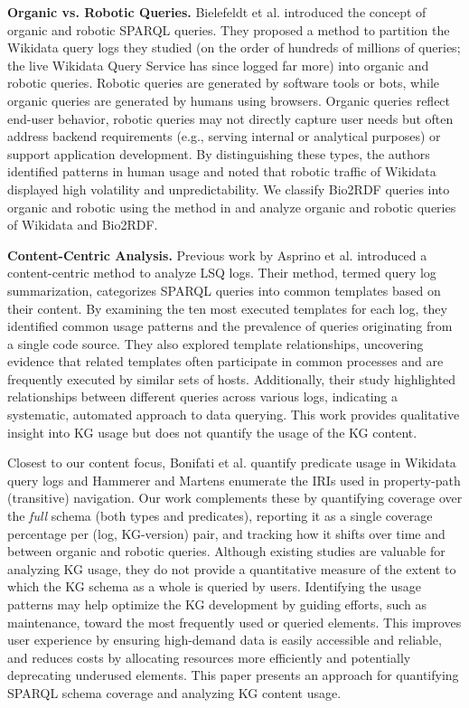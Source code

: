 \documentclass[sw]{iosart2x}
\begin{document}
\textbf{Organic vs. Robotic Queries.} Bielefeldt et al. \cite{bielefeldt2018practical,malyshev2018getting} introduced the concept of organic and robotic SPARQL queries. They proposed a method to partition the Wikidata query logs they studied (on the order of hundreds of millions of queries; the live Wikidata Query Service has since logged far more) into organic and robotic queries. Robotic queries are generated by software tools or bots, while organic queries are generated by humans using browsers. Organic queries reflect end-user behavior, robotic queries may not directly capture user needs but often address backend requirements (e.g., serving internal or analytical purposes) or support application development. By distinguishing these types, the authors identified patterns in human usage and noted that robotic traffic of Wikidata displayed high volatility and unpredictability. We classify Bio2RDF queries into organic and robotic using the method in \cite{malyshev2018getting} and analyze organic and robotic queries of Wikidata and Bio2RDF.

\textbf{Content-Centric Analysis.} Previous work by Asprino et al. \cite{asprino2023your} introduced a content-centric method to analyze LSQ logs. Their method, termed query log summarization, categorizes SPARQL queries into common templates based on their content. By examining the ten most executed templates for each log, they identified common usage patterns and the prevalence of queries originating from a single code source. They also explored template relationships, uncovering evidence that related templates often participate in common processes and are frequently executed by similar sets of hosts. Additionally, their study highlighted relationships between different queries across various logs, indicating a systematic, automated approach to data querying. This work provides qualitative insight into KG usage but does not quantify the usage of the KG content.

Closest to our content focus, Bonifati et al. \cite{bonifati2019navigating} quantify predicate usage in Wikidata query logs and Hammerer and Martens \cite{hammerer2025compendium} enumerate the IRIs used in property-path (transitive) navigation. Our work complements these by quantifying coverage over the \emph{full} schema (both types and predicates), reporting it as a single coverage percentage per (log, KG-version) pair, and tracking how it shifts over time and between organic and robotic queries. Although existing studies are valuable for analyzing KG usage, they do not provide a quantitative measure of the extent to which the KG schema as a whole is queried by users. Identifying the usage patterns may help optimize the KG development by guiding efforts, such as maintenance, toward the most frequently used or queried elements. This improves user experience by ensuring high-demand data is easily accessible and reliable, and reduces costs by allocating resources more efficiently and potentially deprecating underused elements. This paper presents an approach for quantifying SPARQL schema coverage and analyzing KG content usage.
\end{document}
